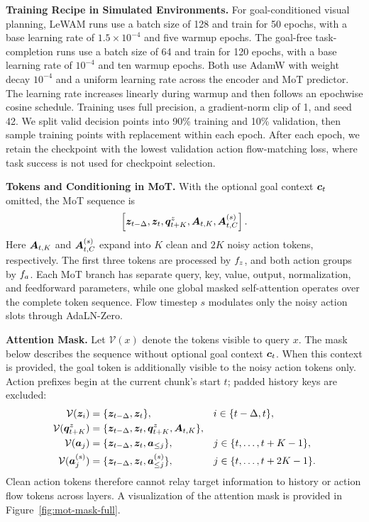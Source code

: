 \documentclass{article} %
\newcommand{\lead}[1]{\textbf{#1}}
\begin{document}
\lead{Training Recipe in Simulated Environments.} For goal-conditioned visual planning, LeWAM runs use a batch size of 128 and train for 50 epochs, with a base learning rate of $1.5\times10^{-4}$ and five warmup epochs. The goal-free task-completion runs use a batch size of 64 and train for 120 epochs, with a base learning rate of $10^{-4}$ and ten warmup epochs. Both use AdamW with weight decay $10^{-4}$ and a uniform learning rate across the encoder and MoT predictor. The learning rate increases linearly during warmup and then follows an epochwise cosine schedule. Training uses full precision, a gradient-norm clip of 1, and seed 42. We split valid decision points into 90\% training and 10\% validation, then sample training points with replacement within each epoch. After each epoch, we retain the checkpoint with the lowest validation action flow-matching loss, where task success is not used for checkpoint selection.

\lead{Tokens and Conditioning in MoT.} With the optional goal context ${\bm{c}}_t$ omitted, the MoT sequence is
\begin{equation}
    \left[
    {\bm{z}}_{t-\Delta},{\bm{z}}_t,{\bm{q}}^z_{t+K},
    {\bm{A}}_{t,K},{\bm{A}}_{t,C}^{(s)}
    \right].
    \label{eq:mot-tokens}
\end{equation}
Here ${\bm{A}}_{t,K}$ and ${\bm{A}}_{t,C}^{(s)}$ expand into $K$ clean and $2K$ noisy action tokens, respectively.
The first three tokens are processed by $f_z$, and both action groups by $f_a$. Each MoT branch has separate query, key, value, output, normalization, and
feedforward parameters, while one global masked self-attention operates over the complete token sequence. Flow timestep
$s$ modulates only the noisy action slots through AdaLN-Zero.

\lead{Attention Mask.} Let $\mathcal{V}(x)$ denote the tokens visible to query $x$. The mask below describes the sequence without optional goal context ${\bm{c}}_t$. When this context is provided, the goal token is additionally visible to the noisy action tokens only.
Action prefixes begin at the current chunk's start $t$; padded history keys are excluded:
\begin{equation}
\begin{aligned}
\mathcal{V}({\bm{z}}_i)
    &=\{{\bm{z}}_{t-\Delta},{\bm{z}}_t\},
    && i\in\{t-\Delta,t\},\\
\mathcal{V}({\bm{q}}^z_{t+K})
    &=\{{\bm{z}}_{t-\Delta},{\bm{z}}_t,{\bm{q}}^z_{t+K},{\bm{A}}_{t,K}\},\\
\mathcal{V}({\bm{a}}_j)
    &=\{{\bm{z}}_{t-\Delta},{\bm{z}}_t,{\bm{a}}_{\leq j}\},
    &&j\in\{t,\ldots,t+K-1\},\\
\mathcal{V}({\bm{a}}_j^{(s)})
    &=\{{\bm{z}}_{t-\Delta},{\bm{z}}_t,{\bm{a}}_{\leq j}^{(s)}\},
    &&j\in\{t,\ldots,t+2K-1\}.
\end{aligned}
\label{eq:mot-mask}
\end{equation}
Clean action tokens therefore cannot relay target information to history or action flow tokens across layers. A visualization of the attention mask is provided in Figure~\ref{fig:mot-mask-full}.
\end{document}
